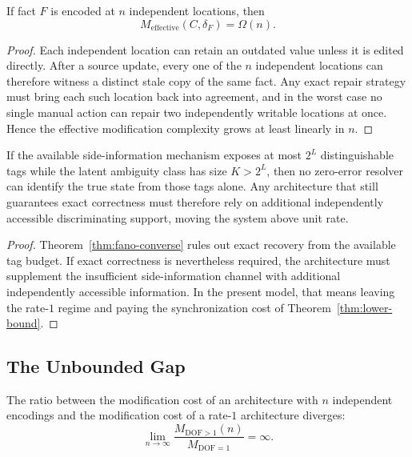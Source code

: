 \begin{theorem}\label{thm:lower-bound}
If fact $F$ is encoded at $n$ independent locations, then
\[
M_{\mathrm{effective}}(C,\delta_F)=\Omega(n).
\]
\end{theorem}

\begin{proof}
Each independent location can retain an outdated value unless it is edited directly. After a source update, every one of the $n$ independent locations can therefore witness a distinct stale copy of the same fact. Any exact repair strategy must bring each such location back into agreement, and in the worst case no single manual action can repair two independently writable locations at once. Hence the effective modification complexity grows at least linearly in $n$.
\end{proof}

\begin{lemma}\label{lem:info-dof}
If the available side-information mechanism exposes at most $2^L$ distinguishable tags while the latent ambiguity class has size $K>2^L$, then no zero-error resolver can identify the true state from those tags alone. Any architecture that still guarantees exact correctness must therefore rely on additional independently accessible discriminating support, moving the system above unit rate.
\end{lemma}

\begin{proof}
Theorem~\ref{thm:fano-converse} rules out exact recovery from the available tag budget. If exact correctness is nevertheless required, the architecture must supplement the insufficient side-information channel with additional independently accessible information. In the present model, that means leaving the rate-$1$ regime and paying the synchronization cost of Theorem~\ref{thm:lower-bound}.
\end{proof}

\subsection{The Unbounded Gap}\label{sec:gap}

\begin{theorem}\label{thm:unbounded-gap}
The ratio between the modification cost of an architecture with $n$ independent encodings and the modification cost of a rate-$1$ architecture diverges:
\[
\lim_{n\to\infty}\frac{M_{\mathrm{DOF}>1}(n)}{M_{\mathrm{DOF}=1}}=\infty.
\]
\end{theorem}

